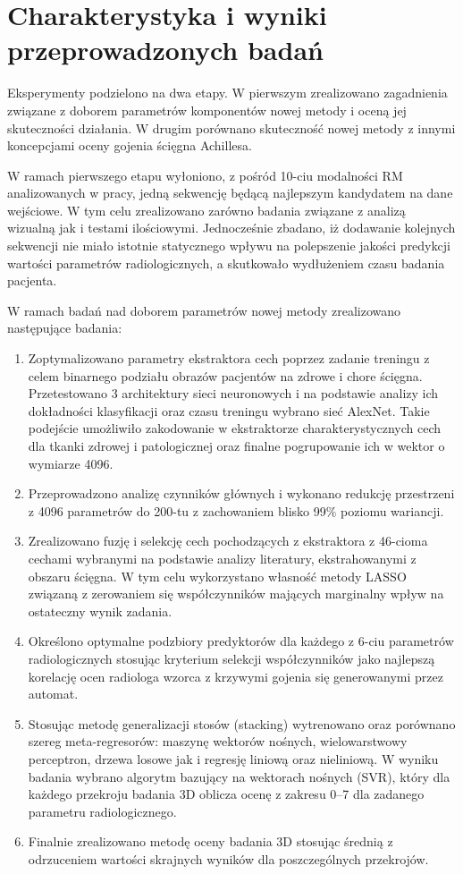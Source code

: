 {\let\clearpage\relax\chapter*{Charakterystyka i wyniki przeprowadzonych badań}}

Eksperymenty podzielono na dwa etapy. W pierwszym zrealizowano zagadnienia związane z doborem parametrów komponentów nowej metody i oceną jej skuteczności działania. W drugim porównano skuteczność nowej metody z innymi koncepcjami oceny gojenia ścięgna Achillesa. 

W ramach pierwszego etapu wyłoniono, z pośród 10-ciu modalności RM analizowanych w pracy, jedną sekwencję będącą najlepszym kandydatem na dane wejściowe. W tym celu zrealizowano zarówno badania związane z analizą wizualną jak i testami ilościowymi. Jednocześnie zbadano, iż dodawanie kolejnych sekwencji nie miało istotnie statycznego wpływu na polepszenie jakości predykcji wartości parametrów radiologicznych, a skutkowało wydłużeniem czasu badania pacjenta. 

W ramach badań nad doborem parametrów nowej metody zrealizowano następujące badania:
\begin{enumerate}
	\item Zoptymalizowano parametry ekstraktora cech poprzez zadanie treningu z celem binarnego podziału obrazów pacjentów na zdrowe i chore ścięgna. Przetestowano 3 architektury sieci neuronowych i na podstawie analizy ich dokładności klasyfikacji oraz czasu treningu wybrano sieć AlexNet. Takie podejście umożliwiło zakodowanie w ekstraktorze charakterystycznych cech dla tkanki zdrowej i patologicznej oraz finalne pogrupowanie ich w wektor o wymiarze 4096.
	\item Przeprowadzono analizę czynników głównych i wykonano redukcję przestrzeni z 4096 parametrów do 200-tu z zachowaniem blisko 99\% poziomu wariancji.
	\item Zrealizowano fuzję i selekcję cech pochodzących z ekstraktora z 46-cioma cechami wybranymi na podstawie analizy literatury, ekstrahowanymi z obszaru ścięgna. W tym celu wykorzystano własność metody LASSO związaną z zerowaniem się współczynników mających marginalny wpływ na ostateczny wynik zadania.
	\item Określono optymalne podzbiory predyktorów dla każdego z 6-ciu parametrów radiologicznych stosując kryterium selekcji współczynników jako najlepszą korelację ocen radiologa wzorca z krzywymi gojenia się generowanymi przez automat.
	\item Stosując metodę generalizacji stosów (stacking) wytrenowano oraz porównano szereg meta-regresorów: maszynę wektorów nośnych, wielowarstwowy perceptron, drzewa losowe jak i regresję liniową oraz nieliniową. W wyniku badania wybrano algorytm bazujący na wektorach nośnych (SVR), który dla każdego przekroju badania 3D oblicza ocenę z zakresu 0--7 dla zadanego parametru radiologicznego.
	\item Finalnie zrealizowano metodę oceny badania 3D stosując średnią z odrzuceniem wartości skrajnych wyników dla poszczególnych przekrojów.
\end{enumerate}

